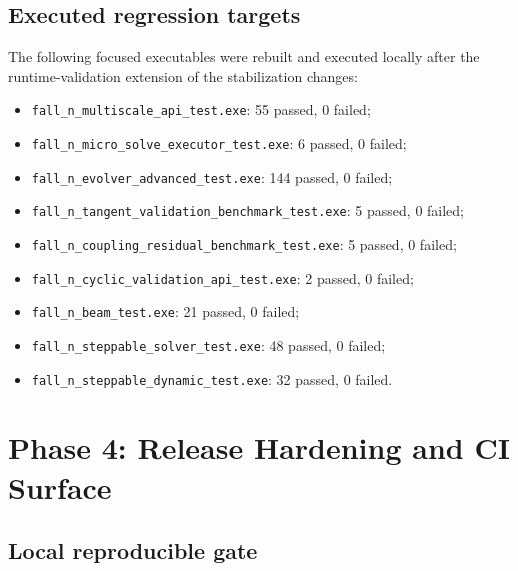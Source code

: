 \subsection{Executed regression targets}

The following focused executables were rebuilt and executed locally after the
runtime-validation extension of the stabilization changes:
\begin{itemize}
  \item \texttt{fall\_n\_multiscale\_api\_test.exe}: 55 passed, 0 failed;
  \item \texttt{fall\_n\_micro\_solve\_executor\_test.exe}: 6 passed, 0 failed;
  \item \texttt{fall\_n\_evolver\_advanced\_test.exe}: 144 passed, 0 failed;
  \item \texttt{fall\_n\_tangent\_validation\_benchmark\_test.exe}: 5 passed,
    0 failed;
  \item \texttt{fall\_n\_coupling\_residual\_benchmark\_test.exe}: 5 passed,
    0 failed;
  \item \texttt{fall\_n\_cyclic\_validation\_api\_test.exe}: 2 passed,
    0 failed;
  \item \texttt{fall\_n\_beam\_test.exe}: 21 passed, 0 failed;
  \item \texttt{fall\_n\_steppable\_solver\_test.exe}: 48 passed, 0 failed;
  \item \texttt{fall\_n\_steppable\_dynamic\_test.exe}: 32 passed, 0 failed.
\end{itemize}

\section{Phase 4: Release Hardening and CI Surface}
\label{sec:ms-stab-phase4}

\subsection{Local reproducible gate}

